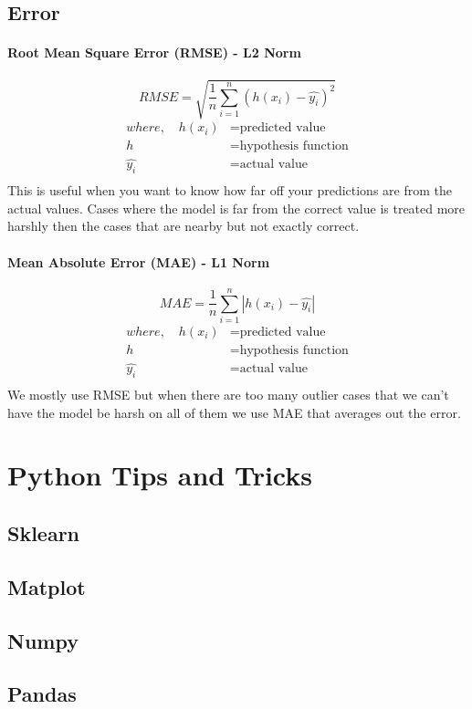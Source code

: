 \documentclass{article}
\begin{document}
\subsection{Error}

\paragraph{Root Mean Square Error (RMSE) - L2 Norm}
\begin{equation}
    RMSE = \sqrt{\frac{1}{n}\sum_{i=1}^{n}(h(x_i) - \hat{y_i})^2}
\end{equation}
\begin{align*}
    where, \quad h(x_i) &= \text{predicted value} \\
    h &= \text{hypothesis function} \\
    \hat{y_i} &= \text{actual value} \\
\end{align*}
This is useful when you want to know how far off your predictions are from the actual values.
Cases where the model is far from the correct value is treated more harshly then the cases that are nearby but not exactly correct.


\paragraph{Mean Absolute Error (MAE) - L1 Norm}
\begin{equation}
    MAE = \frac{1}{n}\sum_{i=1}^{n}|h(x_i) - \hat{y_i}|
\end{equation}
\begin{align*}
    where, \quad h(x_i) &= \text{predicted value} \\
    h &= \text{hypothesis function} \\
    \hat{y_i} &= \text{actual value} \\
\end{align*}
We mostly use RMSE but when there are too many outlier cases that we can't have the model be harsh on all of them we use MAE that averages out the error.

\newpage
\section{Python Tips and Tricks}
\subsection{Sklearn}
\subsection{Matplot}
\subsection{Numpy}
\subsection{Pandas}
\end{document}
